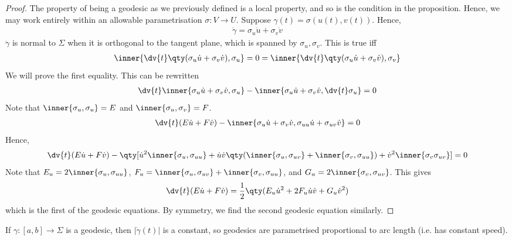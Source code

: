 \begin{proof}
	The property of being a geodesic as we previously defined is a local property, and so is the condition in the proposition.
	Hence, we may work entirely within an allowable parametrisation $\sigma \colon V \to U$.
	Suppose $\gamma(t) = \sigma(u(t), v(t))$.
	Hence,
	\begin{align*}
		\dot \gamma = \sigma_u \dot u + \sigma_v \dot v
	\end{align*}
	$\ddot \gamma$ is normal to $\Sigma$ when it is orthogonal to the tangent plane, which is spanned by $\sigma_u, \sigma_v$.
	This is true iff
	\begin{align*}
		\inner{ \dv{t} \qty(\sigma_u \dot u + \sigma_v \dot v), \sigma_u } = 0 = \inner{ \dv{t} \qty(\sigma_u \dot u + \sigma_v \dot v), \sigma_v }
	\end{align*}
	We will prove the first equality.
	This can be rewritten
	\begin{align*}
		\dv{t} \inner{\sigma_u \dot u + \sigma_v \dot v, \sigma_u} - \inner{\sigma_u \dot u + \sigma_v \dot v, \dv{t} \sigma_u} = 0
	\end{align*}
	Note that $\inner{\sigma_u, \sigma_u} = E$ and $\inner{\sigma_u, \sigma_v} = F$.
	\begin{align*}
		\dv{t} (E \dot u + F \dot v) - \inner{\sigma_u \dot u + \sigma_v \dot v, \sigma_{uu} \dot u + \sigma_{uv} \dot v} = 0
	\end{align*}
	Hence,
	\begin{align*}
		\dv{t} (E \dot u + F \dot v) - \qty[ \dot u^2 \inner{\sigma_u, \sigma_{uu}} + \dot u \dot v \qty(\inner{\sigma_u, \sigma_{uv}} + \inner{\sigma_v, \sigma_{uu}}) + \dot v^2 \inner{\sigma_v \sigma_{uv}} ] = 0
	\end{align*}
	Note that $E_u = 2 \inner{\sigma_u, \sigma_{uu}}$, $F_u = \inner{\sigma_u, \sigma_{uv}} + \inner{\sigma_v, \sigma_{uu}}$, and $G_u = 2\inner{\sigma_v, \sigma_{uv}}$.
	This gives
	\begin{align*}
		\dv{t} (E \dot u + F \dot v) = \frac{1}{2} \qty(E_u \dot u^2 + 2 F_u \dot u \dot v + G_u \dot v^2)
	\end{align*}
	which is the first of the geodesic equations.
	By symmetry, we find the second geodesic equation similarly.
\end{proof}

\begin{corollary} \label{cor:3.2}
	If $\gamma : [a, b] \to \Sigma$ is a geodesic, then $|\dot{\gamma}(t)|$ is a constant, so geodesics are parametrised proportional to arc length (i.e. has constant speed).
\end{corollary} 

